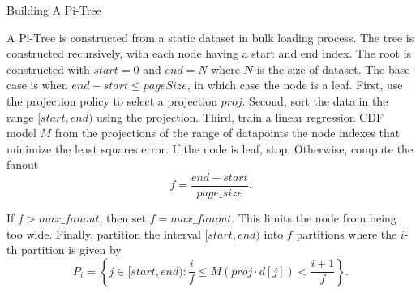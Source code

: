 \documentclass[sigconf,10pt]{acmart}
\begin{document}
\begin{algorithm}
  \caption{Building A Pi-Tree}
\end{algorithm}

A Pi-Tree is constructed from a static dataset in bulk loading process.
The tree is constructed recursively, with each node having a start and 
end index. The root is constructed with $start=0$ and $end=N$ where $N$
is the size of dataset. The base case is when $end - start \leq pageSize$,
in which case the node is a leaf.
First, use the projection policy to select a projection $proj$.
Second, sort the data in the range $[start, end)$ using the projection.
Third, train a linear regression CDF model $M$ from the projections of the range of datapoints
the node indexes that minimize the least squares error. If the node is leaf, stop. Otherwise,
compute the fanout
\[
  f = \frac{end - start}{page\_size}.
\]

If $f > max\_fanout$, then set $f = max\_fanout$. This limits
the node from being too wide. 
Finally, partition the interval $[start, end)$ into $f$ partitions
where the $i$-th partition is given by
\[
  P_i = \left\{j \in [start, end): \frac{i}{f} \leq M(proj \cdot d[j]) < \frac{i+1}{f} \right\}.
\]
\end{document}
